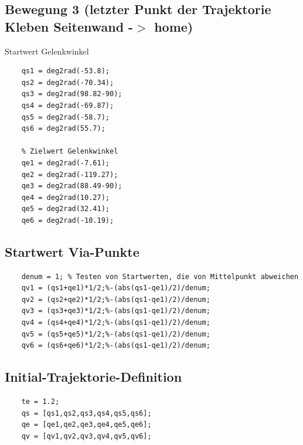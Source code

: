\subsection*{Bewegung 3 (letzter Punkt der Trajektorie Kleben Seitenwand -\ensuremath{>} home)}
%
\begin{par}
	Startwert Gelenkwinkel
\end{par} \vspace{1em}
\begin{lstlisting}
	qs1 = deg2rad(-53.8);
	qs2 = deg2rad(-70.34);
	qs3 = deg2rad(98.82-90);
	qs4 = deg2rad(-69.87);
	qs5 = deg2rad(-58.7);
	qs6 = deg2rad(55.7);
	
	% Zielwert Gelenkwinkel
	qe1 = deg2rad(-7.61);
	qe2 = deg2rad(-119.27);
	qe3 = deg2rad(88.49-90);
	qe4 = deg2rad(10.27);
	qe5 = deg2rad(32.41);
	qe6 = deg2rad(-10.19);
\end{lstlisting}
%
\subsection*{Startwert Via-Punkte}
%
\begin{lstlisting}
	denum = 1; % Testen von Startwerten, die von Mittelpunkt abweichen
	qv1 = (qs1+qe1)*1/2;%-(abs(qs1-qe1)/2)/denum;
	qv2 = (qs2+qe2)*1/2;%-(abs(qs1-qe1)/2)/denum;
	qv3 = (qs3+qe3)*1/2;%-(abs(qs1-qe1)/2)/denum;
	qv4 = (qs4+qe4)*1/2;%-(abs(qs1-qe1)/2)/denum;
	qv5 = (qs5+qe5)*1/2;%-(abs(qs1-qe1)/2)/denum;
	qv6 = (qs6+qe6)*1/2;%-(abs(qs1-qe1)/2)/denum;
\end{lstlisting}
%
\subsection*{Initial-Trajektorie-Definition}
%
\begin{lstlisting}
	te = 1.2;
	qs = [qs1,qs2,qs3,qs4,qs5,qs6];
	qe = [qe1,qe2,qe3,qe4,qe5,qe6];
	qv = [qv1,qv2,qv3,qv4,qv5,qv6];
\end{lstlisting}
%
